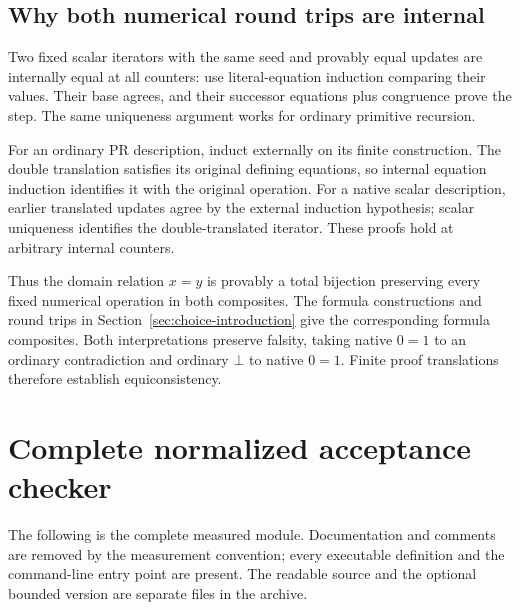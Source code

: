 \documentclass[11pt,a4paper]{article}
\theoremstyle{definition}\newtheorem{definition}[theorem]{Definition}
\theoremstyle{remark}\newtheorem{remark}[theorem]{Remark}
\begin{document}
\subsection{Why both numerical round trips are internal}

Two fixed scalar iterators with the same seed and provably equal
updates are internally equal at all counters: use literal-equation
induction comparing their values. Their base agrees, and their
successor equations plus congruence prove the step. The same
uniqueness argument works for ordinary primitive recursion.

For an ordinary PR description, induct externally on its finite
construction. The double translation satisfies its original
defining equations, so internal equation induction identifies it
with the original operation. For a native scalar description,
earlier translated updates agree by the external induction
hypothesis; scalar uniqueness identifies the double-translated
iterator. These proofs hold at arbitrary internal counters.

Thus the domain relation $x=y$ is provably a total bijection
preserving every fixed numerical operation in both composites.
The formula constructions and round trips in
Section~\ref{sec:choice-introduction} give the corresponding formula
composites. Both interpretations preserve falsity, taking native
$0=1$ to an ordinary contradiction and ordinary $\bot$ to native
$0=1$. Finite proof translations therefore establish equiconsistency.



\clearpage
\section{Complete normalized acceptance checker}
\label{app:checker}

The following is the complete measured module. Documentation and comments
are removed by the measurement convention; every executable definition
and the command-line entry point are present. The readable source and
the optional bounded version are separate files in the archive.
\end{document}
